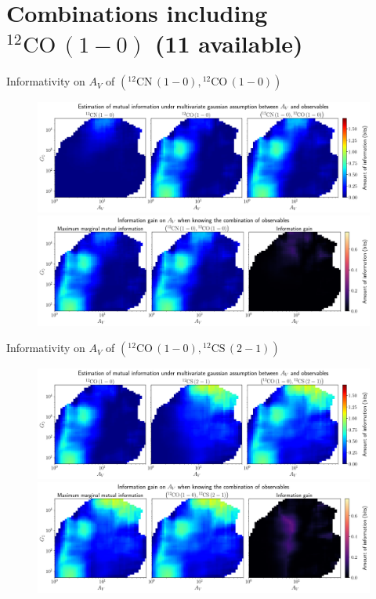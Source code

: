 \documentclass{beamer}
\begin{document}
\section{Combinations including $\mathrm{^{12}CO\,(1-0)}$ (11 available)}

\begin{frame}{Informativity on $A_V$ of $\left(\mathrm{^{12}CN\,(1-0)},\mathrm{^{12}CO\,(1-0)}\right)$}
    \begin{figure}
        \centering
        \includegraphics[width=0.95\linewidth]{../linearinfogauss/av__12cn10_12co10_linearinfogauss.png}
        \vfill
        \includegraphics[width=0.95\linewidth]{../linearinfogauss/av__12cn10_12co10_linearinfogauss_gain.png}
    \end{figure}
\end{frame}

\begin{frame}{Informativity on $A_V$ of $\left(\mathrm{^{12}CO\,(1-0)},\mathrm{^{12}CS\,(2-1)}\right)$}
    \begin{figure}
        \centering
        \includegraphics[width=0.95\linewidth]{../linearinfogauss/av__12co10_12cs21_linearinfogauss.png}
        \vfill
        \includegraphics[width=0.95\linewidth]{../linearinfogauss/av__12co10_12cs21_linearinfogauss_gain.png}
    \end{figure}
\end{frame}
\end{document}
